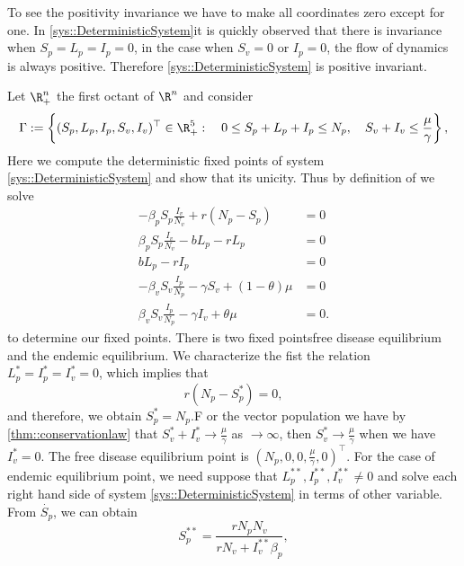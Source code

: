
To see the positivity invariance we have to make all coordinates zero except for
one. In \autoref{sys::DeterministicSystem}it is quickly observed that there is
invariance when $ S_p = L_p = I_p = 0 $, in the case when $ S_v = 0 $ or 
$ I_p = 0 $, the flow of dynamics is always positive. Therefore
\autoref{sys::DeterministicSystem} is positive invariant.

Let $\R^n_+$ the first octant of $\R ^ n$ and consider  
$$	{
	\Gamma:= 
		\left \{ 
			(S_p, L_p, I_p, S_v, I_v)^{\top} \in \R^5_+: \quad
			0\leq S_p + L_p + I_p \leq N_p, \quad
			S_v + I_v \leq \frac{\mu}{\gamma}
		\right \},
	}
$$
Here we compute the deterministic fixed points of system 
\eqref{sys::DeterministicSystem} and show that its unicity. Thus by definition of we solve 
%
\begin{equation}
	\begin{aligned}
		-\beta_p S_p \frac{I_v}{N_v} + r(N_p-S_p) &= 0\\
		\beta_p S_p \frac{I_v}{N_v} - b L_p - r L_p &= 0\\
		b L_p - r I_p &= 0\\
		-\beta_v S_v \frac{I_p}{N_p} -\gamma S_v +(1-\theta) \mu &= 0\\
		\beta_v S_v \frac{I_p}{N_p} -\gamma I_v + \theta \mu &= 0.
	\end{aligned}
\end{equation}
to determine our fixed points.
%
There is two fixed points\textemdash free disease equilibrium and the 
endemic equilibrium. We characterize the fist the relation
$ L^*_p=I_p^*=I_v^*=0$, which implies that
%
\begin{equation*}
	r(N_p-S^*_p) = 0,
\end{equation*}
%
and therefore, we obtain $S_p^*=N_p$.F or the vector population we have by 
\autoref{thm::conservationlaw} that $S_v^*+I_v^* \rightarrow \frac{\mu}{\gamma}$ as 
$\rightarrow \infty$, then $S_v^* \rightarrow \frac{\mu}{\gamma}$ when we have 
$I^*_v=0$.
%
The free disease equilibrium point is $(N_p,0,0,\frac{\mu}{\gamma},0)^{\top}$. 
For the case of endemic equilibrium point, we need suppose that $L_p^{**},I_p^{**},I_
v^{**}\neq0$ and solve each right hand side of system \autoref{sys::DeterministicSystem} in terms
of other variable.
%
From $\dot{S_p}$, we can obtain
%
\begin{equation*}
	S^{**}_p= \frac{rN_{{p}}N_{{v}}}{rN_{{v}}+I^{**}_v\beta_{{p}}},
\end{equation*}
